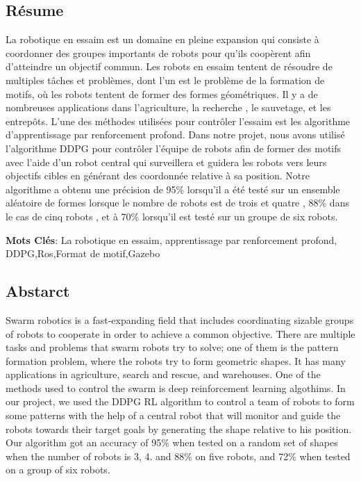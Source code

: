 \documentclass[12pt]{extarticle}
\begin{document}
\subsection{Résume}



La robotique en essaim est un domaine en pleine expansion qui consiste à coordonner des groupes importants de robots pour qu'ils coopèrent afin d'atteindre un objectif commun. Les robots en essaim tentent de résoudre de multiples tâches et problèmes, dont l'un est le problème de la formation de motifs, où les robots tentent de former des formes géométriques. Il y a de nombreuses applications dans l'agriculture, la recherche , le sauvetage, et les entrepôts. L'une des méthodes utilisées pour contrôler l'essaim est les algorithme d'apprentissage par renforcement profond. Dans notre projet, nous avons utilisé l'algorithme DDPG pour contrôler l'équipe de robots afin de former des motifs avec l'aide d'un robot central qui surveillera et guidera les robots vers leurs objectifs cibles en générant des 
coordonnée  relative à sa position. Notre algorithme a obtenu  une précision de 95\% lorsqu'il a été testé sur un ensemble aléatoire de formes lorsque le nombre de robots est de trois et quatre ,  88\% dans le cas de cinq robots , et à 70\% lorsqu'il est testé sur un groupe de six robots.

\textbf{Mots Clés}: La robotique en essaim, apprentissage par renforcement profond, DDPG,Ros,Format de motif,Gazebo

\pagebreak

\subsection{Abstarct}

Swarm robotics is a fast-expanding field that includes coordinating sizable groups of robots to cooperate in order to achieve a common objective. There are multiple tasks and problems that swarm robots try to solve; one of them is the pattern formation problem, where the robots try to form geometric shapes. It has many applications in agriculture, search and rescue, and warehouses. One of the methods used to control the swarm is deep reinforcement learning algothims. In our project, we used the DDPG RL algorithm to control a team of robots to form some patterns with the help of a central robot that will monitor and guide the robots towards their target goals by generating the shape relative to his position. Our algorithm got an accuracy of 95\% when tested on a random set of shapes when the number of robots is 3, 4. and 88\% on five robots, and  72\% when tested on a group of six robots.\\
\end{document}

